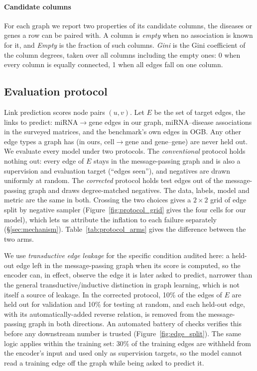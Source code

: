 \documentclass[review]{elsarticle}
\begin{document}
\paragraph{Candidate columns} For each graph we report two properties of its candidate columns, the diseases or genes a row can be paired with. A column is \emph{empty} when no association is known for it, and \emph{Empty} is the fraction of such columns. \emph{Gini} is the Gini coefficient of the column degrees, taken over all columns including the empty ones: 0 when every column is equally connected, 1 when all edges fall on one column.

\subsection{Evaluation protocol}
Link prediction scores node pairs $(u,v)$. Let $E$ be the set of target edges, the links
to predict: miRNA$\to$gene edges in our graph, miRNA--disease associations in the surveyed
matrices, and the benchmark's own edges in OGB. Any other edge types a graph has (in ours,
cell$\to$gene and gene--gene) are never held out. We evaluate every model under two
protocols. The \emph{conventional} protocol holds nothing out: every edge of $E$ stays in
the message-passing graph and is also a supervision and evaluation target (``edges
seen''), and negatives are drawn uniformly at random. The \emph{corrected} protocol holds test edges out of the message-passing graph and
draws degree-matched negatives. The data, labels, model and metric are the same in both. Crossing the two choices gives a $2\times2$ grid of edge
split by negative sampler (Figure~\ref{fig:protocol_grid} gives the four cells for our model), which lets us attribute the inflation to each failure
separately (\S\ref{sec:mechanism}). Table~\ref{tab:protocol_arms} gives the
difference between the two arms.



We use \emph{transductive edge leakage} for the specific condition audited here: a
held-out edge left in the message-passing graph when its score is computed, so the
encoder can, in effect, observe the edge it is later asked to predict, narrower than
the general transductive/inductive distinction in graph learning, which is not itself a
source of leakage. In the corrected protocol, 10\% of the edges of $E$ are held
out for validation and 10\% for testing at random, and each held-out edge, with its
automatically-added reverse relation, is removed from the message-passing graph in both
directions. An automated battery of checks verifies this before any downstream number is
trusted (Figure~\ref{fig:edge_split}). The same logic applies within the training set: 30\%
of the training edges are withheld from the encoder's input and used only as supervision
targets, so the model cannot read a training edge off the graph while being asked to
predict it.
\end{document}
